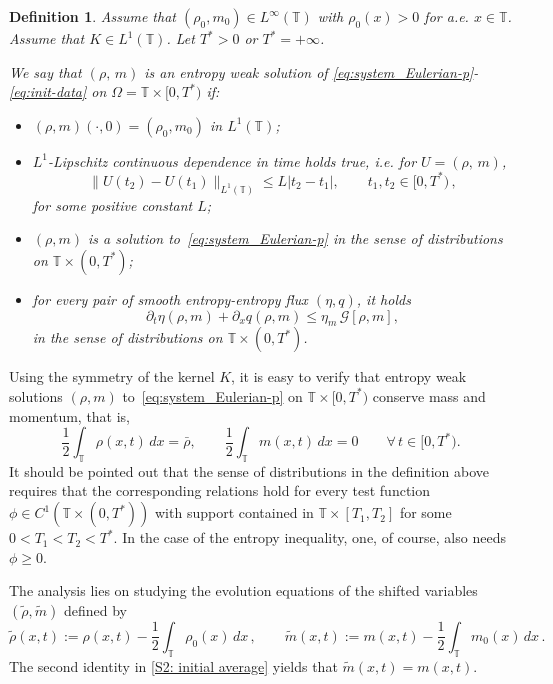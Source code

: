 \documentclass[10pt,reqno]{amsart}
\newtheorem{definition}{Definition}[section]
\newcommand{\bbt} {\mathbb T}
\newcommand{\R}{\mathbb{R}}
\begin{document}
\begin{definition}
Assume that $(\rho_0,m_0)\in L^\infty(\bbt)$ with $\rho_0(x)>0 $ for a.e. $x\in\bbt$.
Assume that $K\in L^1(\bbt)$. Let $T^*>0$ or $T^*=+\infty$.  
      
        We say that $(\rho,\,m)$ is an entropy weak solution of \eqref{eq:system_Eulerian-p}-%
        \eqref{eq:init-data} on $\Omega = \bbt\times [0,T^*)$ if:
    \begin{itemize}
\item $(\rho,m)(\cdot,0)=(\rho_0,m_0)$ in $L^1(\bbt)$;
\item $L^1$-Lipschitz continuous dependence in time holds true, i.e. for $ U = (\rho,\, m)$,
        $$
            \|  U(t_2)- U(t_1)\|_{L^1(\bbt)} \leq L|t_2-t_1|,\qquad t_1,t_2\in [0,T^*)%
            \,,
      $$ for some positive constant $L$;
\item $(\rho,m)$ is a solution to~\eqref{eq:system_Eulerian-p} in the sense of distributions on $\bbt\times (0,T^*)$;
\item for every pair of smooth entropy-entropy flux $(\eta,q)$, it holds
  \begin{equation*}
        \partial_t\eta(\rho,m)+\partial_x q(\rho,m) \leq \eta_m \, \mathcal{G}[\rho,m],
    \end{equation*}
    in the sense of distributions on $\bbt\times (0,T^*)$.
        \end{itemize}
\end{definition}

Using the symmetry of the kernel $K$, it is easy to verify that entropy weak solutions $(\rho,m)$ to~\eqref{eq:system_Eulerian-p} 
on $\bbt\times[0,T^*)$ conserve mass and momentum, that is,
\begin{equation*}
    \frac{1}{2}\int_\bbt \rho(x,t)\,dx=\bar\rho, \qquad \frac{1}{2}\int_\bbt m(x,t)\,dx=0\qquad \forall\, t\in [0,T^*).
\end{equation*}
It should be pointed out that the sense of distributions in the definition above requires that the corresponding relations hold for every test function $\phi\in C^1(\bbt\times (0,T^*))$ with support contained in $\bbt\times [T_1,T_2]$ for some $0<T_1<T_2<T^*$. In the case of the entropy inequality, one, of course, also needs $\phi\ge 0$.
    
The analysis lies on studying the evolution equations of the shifted variables $(\tilde\rho, \tilde m)$ defined by
\begin{equation}\label{def:tilde-var}
    \tilde\rho(x,t):=\rho(x,t)-\frac{1}{2}\int_{\bbt}\rho_0(x)\,dx\,,\qquad \tilde m(x,t):=m(x,t)-\frac{1}{2}\int_{\bbt}m_0(x)\,dx\,.
\end{equation}
The second identity in \eqref{S2: initial average} yields that $\tilde m(x,t) =m(x,t)$.
\end{document}
